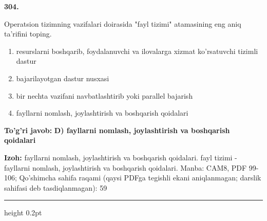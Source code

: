 \documentclass[10pt,a4paper]{article}
\begin{document}
{\bfseries\sffamily\color{ink} 304.}
\par
Operatsion tizimning vazifalari doirasida "fayl tizimi" atamasining eng aniq ta'rifini toping.
\begin{enumerate}[label=\Alph*),leftmargin=9mm]
\item resurslarni boshqarib, foydalanuvchi va ilovalarga xizmat ko'rsatuvchi tizimli dastur
\item bajarilayotgan dastur nusxasi
\item bir nechta vazifani navbatlashtirib yoki parallel bajarish
\item fayllarni nomlash, joylashtirish va boshqarish qoidalari
\end{enumerate}
\begin{tcolorbox}[enhanced,breakable,colback=teal!4,colframe=teal!60!black,boxrule=0.45pt,arc=1.2mm,left=2.7mm,right=2.7mm,top=1.8mm,bottom=1.8mm,before skip=2mm,after skip=2mm]
{\bfseries\sffamily\color{teal}To'g'ri javob:} \textbf{D) fayllarni nomlash, joylashtirish va boshqarish qoidalari}
\par\smallskip
{\bfseries Izoh:} fayllarni nomlash, joylashtirish va boshqarish qoidalari. fayl tizimi - fayllarni nomlash, joylashtirish va boshqarish qoidalari. Manba: CAM8, PDF 99-106; Qo'shimcha sahifa raqami (qaysi PDFga tegishli ekani aniqlanmagan; darslik sahifasi deb tasdiqlanmagan): 59
\end{tcolorbox}
\vspace{2mm}\hrule height 0.2pt\vspace{3mm}
\end{document}
